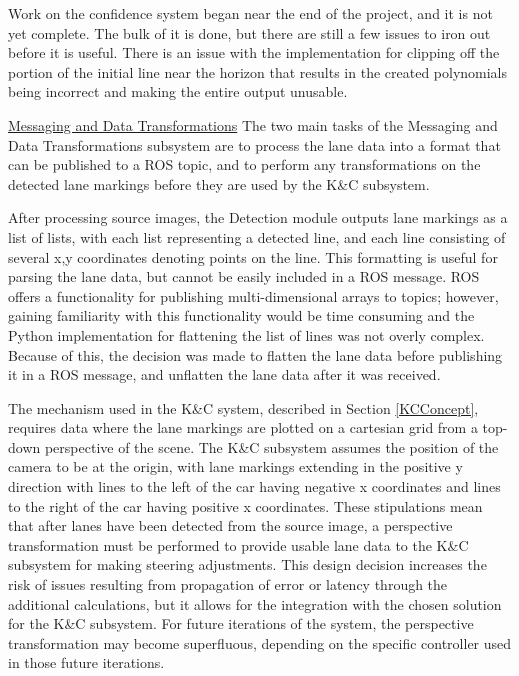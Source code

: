 \documentclass[titlepage,draft]{article}
\begin{document}
{Work on the confidence system began near the end of the project, and it is not yet complete. The bulk of it is done, but there are still a few issues to iron out before it is useful. There is an issue with the implementation for clipping off the portion of the initial line near the horizon that results in the created polynomials being incorrect and making the entire output unusable.

\underline{Messaging and Data Transformations}
The two main tasks of the Messaging and Data Transformations subsystem are to process the lane data into a format that can be published to a ROS topic, and to perform any transformations on the detected lane markings before they are used by the K\&C subsystem.

After processing source images, the Detection module outputs lane markings as a list of lists, with each list representing a detected line, and each line consisting of several x,y coordinates denoting points on the line.  This formatting is useful for parsing the lane data, but cannot be easily included in a ROS message. ROS offers a functionality for publishing multi-dimensional arrays to topics; however, gaining familiarity with this functionality would be time consuming and the Python implementation for flattening the list of lines was not overly complex. Because of this, the decision was made to flatten the lane data before publishing it in a ROS message, and unflatten the lane data after it was received.

The mechanism used in the K\&C system, described in Section \ref{KCConcept}, requires data where the lane markings are plotted on a cartesian grid from a top-down perspective of the scene. The K\&C subsystem assumes the position of the camera to be at the origin, with lane markings extending in the positive y direction with lines to the left of the car having negative x coordinates and lines to the right of the car having positive x coordinates. These stipulations mean that after lanes have been detected from the source image, a perspective transformation must be performed to provide usable lane data to the K\&C subsystem for making steering adjustments. This design decision increases the risk of issues resulting from propagation of error or latency through the additional calculations, but it allows for the integration with the chosen solution for the K\&C subsystem. For future iterations of the system, the perspective transformation may become superfluous, depending on the specific controller used in those future iterations.


}
\end{document}
